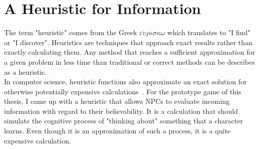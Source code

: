 \section{A Heuristic for Information}
The term "heuristic" comes from the Greek $\varepsilon\acute{\upsilon}\rho\acute{\iota}\sigma\kappa\omega$ which translates to "I find" or "I discover". Heuristics are techniques that approach exact results rather than exactly calculating them. Any method that reaches a sufficient approximation for a given problem in less time than traditional or correct methods can be describes as a heuristic.~\cite{Ippoliti2015}\\
In computer science, heuristic functions also approximate an exact solution for otherwise potentially expensive calculations~\cite{Pearl1984}. For the prototype game of this thesis, I came up with a heuristic that allows NPCs to evaluate incoming information with regard to their believability. It is a calculation that should simulate the cognitive process of "thinking about" something that a character learns. Even though it is an approximation of such a process, it is a quite expensive calculation. 

